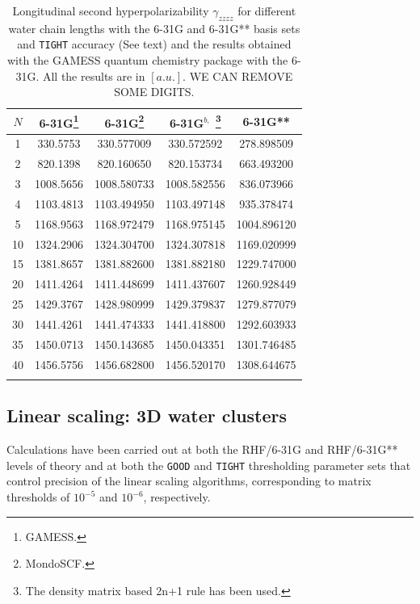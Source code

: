 \documentclass[prl,aps,twocolumn,showpacs,twocolumngrid,superbib]{revtex4}
\begin{document}
\begin{table}
  \centering
  \caption{\protect
    Longitudinal second hyperpolarizability $\gamma_{zzzz}$
    for different water chain lengths with the 6-31G and 6-31G** basis sets
    and {\tt TIGHT} accuracy (See text) and the results obtained with
    the GAMESS quantum chemistry package \cite{gamess} with the 6-31G. 
    All the results are in $[a.u.]$.
    WE CAN REMOVE SOME DIGITS.
  }\label{tab:Gamma_1D_Values}
  \begin{tabular}{ccccc}
    \toprule
    $N$ &\multicolumn{1}{c}{6-31G\footnote[1]{\sc GAMESS.}}
    &\multicolumn{1}{c}{6-31G\footnote[2]{\sc MondoSCF.}}
    &\multicolumn{1}{c}{6-31G$^{b,}$
      \footnote[3]{The density matrix based 2n+1 rule has been used.}}
    &\multicolumn{1}{c}{6-31G**}$^b$ \\
    \hline
     1 &  330.5753 &  330.577009 &  330.572592 &  278.898509 \\
     2 &  820.1398 &  820.160650 &  820.153734 &  663.493200 \\
     3 & 1008.5656 & 1008.580733 & 1008.582556 &  836.073966 \\
     4 & 1103.4813 & 1103.494950 & 1103.497148 &  935.378474 \\
     5 & 1168.9563 & 1168.972479 & 1168.975145 & 1004.896120 \\
    10 & 1324.2906 & 1324.304700 & 1324.307818 & 1169.020999 \\
    15 & 1381.8657 & 1381.882600 & 1381.882180 & 1229.747000 \\
    20 & 1411.4264 & 1411.448699 & 1411.437607 & 1260.928449 \\
    25 & 1429.3767 & 1428.980999 & 1429.379837 & 1279.877079 \\
    30 & 1441.4261 & 1441.474333 & 1441.418800 & 1292.603933 \\
    35 & 1450.0713 & 1450.143685 & 1450.043351 & 1301.746485 \\
    40 & 1456.5756 & 1456.682800 & 1456.520170 & 1308.644675 \\
    \botrule
  \end{tabular}
\end{table}



\subsection{Linear scaling: 3D water clusters}


Calculations have been carried out at both the RHF/6-31G and RHF/6-31G** levels of
theory and at both the {\tt GOOD} and {\tt TIGHT} thresholding parameter 
sets that control precision of the linear scaling algorithms, corresponding 
to matrix thresholds of $10^{-5}$ and $10^{-6}$, respectively.
\end{document}
